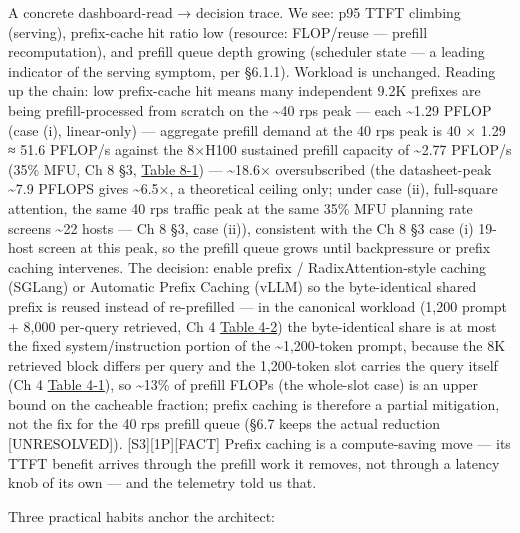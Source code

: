 A concrete dashboard-read → decision trace. We see: p95 TTFT climbing
(serving), prefix-cache hit ratio low (resource: FLOP/reuse --- prefill
recomputation), and prefill queue depth growing (scheduler state --- a
leading indicator of the serving symptom, per §6.1.1). Workload is
unchanged. Reading up the chain: low prefix-cache hit means many
independent 9.2K prefixes are being prefill-processed from scratch on
the \textasciitilde40 rps peak --- each \textasciitilde1.29 PFLOP (case
(i), linear-only) --- aggregate prefill demand at the 40 rps peak is 40
× 1.29 ≈ 51.6 PFLOP/s against the 8×H100 sustained prefill capacity of
\textasciitilde2.77 PFLOP/s (35\% MFU, Ch 8 §3, \hyperref[tab:8.1]{Table 8-1}) ---
\textasciitilde18.6× oversubscribed (the datasheet-peak
\textasciitilde7.9 PFLOPS gives \textasciitilde6.5×, a theoretical
ceiling only; under case (ii), full-square attention, the same 40 rps
traffic peak at the same 35\% MFU planning rate screens
\textasciitilde22 hosts --- Ch 8 §3, case (ii)), consistent with the Ch
8 §3 case (i) 19-host screen at this peak, so the prefill queue grows
until backpressure or prefix caching intervenes. The decision: enable
prefix / RadixAttention-style caching (SGLang) or Automatic Prefix
Caching (vLLM) so the byte-identical shared prefix is reused instead of
re-prefilled --- in the canonical workload (1,200 prompt + 8,000
per-query retrieved, Ch 4 \hyperref[tab:4.2]{Table 4-2}) the byte-identical share is at most
the fixed system/instruction portion of the \textasciitilde1,200-token
prompt, because the 8K retrieved block differs per query and the
1,200-token slot carries the query itself (Ch 4 \hyperref[tab:4.1]{Table 4-1}), so
\textasciitilde13\% of prefill FLOPs (the whole-slot case) is an upper
bound on the cacheable fraction; prefix caching is therefore a partial
mitigation, not the fix for the 40 rps prefill queue (§6.7 keeps the
actual reduction \mbox{{[}UNRESOLVED{]}}). \mbox{{[}S3{]}}\hspace{0pt}\mbox{{[}1P{]}}\hspace{0pt}\mbox{{[}FACT{]}} Prefix
caching is a compute-saving move --- its TTFT benefit arrives through
the prefill work it removes, not through a latency knob of its own ---
and the telemetry told us that.

\label{measurement}


Three practical habits anchor the architect:

